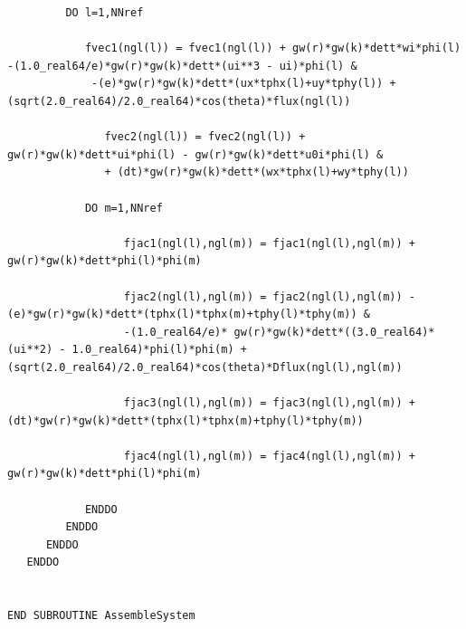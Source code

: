 \documentclass{article}
\begin{document}
\begin{verbatim}
         DO l=1,NNref
            
            fvec1(ngl(l)) = fvec1(ngl(l)) + gw(r)*gw(k)*dett*wi*phi(l) -(1.0_real64/e)*gw(r)*gw(k)*dett*(ui**3 - ui)*phi(l) &
             -(e)*gw(r)*gw(k)*dett*(ux*tphx(l)+uy*tphy(l)) +(sqrt(2.0_real64)/2.0_real64)*cos(theta)*flux(ngl(l))
            
               fvec2(ngl(l)) = fvec2(ngl(l)) + gw(r)*gw(k)*dett*ui*phi(l) - gw(r)*gw(k)*dett*u0i*phi(l) &
               + (dt)*gw(r)*gw(k)*dett*(wx*tphx(l)+wy*tphy(l)) 
               
            DO m=1,NNref
               
                  fjac1(ngl(l),ngl(m)) = fjac1(ngl(l),ngl(m)) + gw(r)*gw(k)*dett*phi(l)*phi(m)
               
                  fjac2(ngl(l),ngl(m)) = fjac2(ngl(l),ngl(m)) -(e)*gw(r)*gw(k)*dett*(tphx(l)*tphx(m)+tphy(l)*tphy(m)) &
                  -(1.0_real64/e)* gw(r)*gw(k)*dett*((3.0_real64)*(ui**2) - 1.0_real64)*phi(l)*phi(m) +(sqrt(2.0_real64)/2.0_real64)*cos(theta)*Dflux(ngl(l),ngl(m))
               
                  fjac3(ngl(l),ngl(m)) = fjac3(ngl(l),ngl(m)) + (dt)*gw(r)*gw(k)*dett*(tphx(l)*tphx(m)+tphy(l)*tphy(m))
               
                  fjac4(ngl(l),ngl(m)) = fjac4(ngl(l),ngl(m)) + gw(r)*gw(k)*dett*phi(l)*phi(m)
                  
            ENDDO
         ENDDO   
      ENDDO
   ENDDO


END SUBROUTINE AssembleSystem
\end{verbatim}
\newpage
\end{document}
